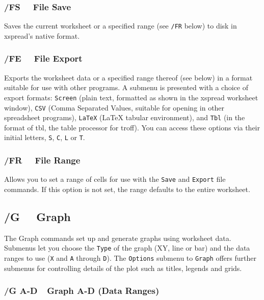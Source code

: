 \documentclass[titlepage]{article}
\begin{document}
\subsubsection{/FS \ \     File Save}

Saves the current worksheet or a specified range (see \texttt{/FR}
below) to disk in \textsf{xspread}'s native format.

\subsubsection{/FE \ \     File Export}

Exports the worksheet data or a specified range thereof (see below)
in a format suitable for use with other programs.  A submenu is
presented with a choice of export formats: \texttt{Screen} (plain
text, formatted as shown in the \textsf{xspread} worksheet window),
\texttt{CSV} (Comma Separated Values, suitable for opening in other
spreadsheet programs), \texttt{LaTeX} (\LaTeX{} tabular environment),
and \texttt{Tbl} (in the format of \textsf{tbl}, the table processor
for \textsf{troff}).  You can access these options via their initial
letters, \texttt{S}, \texttt{C}, \texttt{L} or \texttt{T}.

\subsubsection{/FR \ \     File Range}

Allows you to set a range of cells for use with the \texttt{Save} and
\texttt{Export} file commands.  If this option is not set, the range
defaults to the entire worksheet.
        
\subsection[Graph Commands]{/G  \ \     Graph}

The Graph commands set up and generate graphs using worksheet
data.  Submenus let you choose the \texttt{Type} of the graph (XY,
line or bar) and the data ranges to use (\texttt{X} and \texttt{A}
through \texttt{D}).  The \texttt{Options} submenu to \texttt{Graph}
offers further submenus for controlling details of the plot such as
titles, legends and grids.

\subsubsection{/G A-D\ \  Graph A-D (Data Ranges)}
\end{document}
